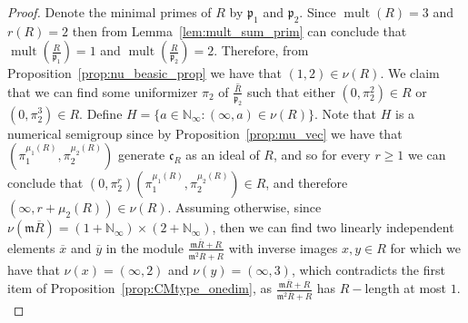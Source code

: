 \documentclass{article}
\DeclareMathOperator{\mult}{mult}
\numberwithin{theorem}{section}
\begin{document}
\begin{proof}
    Denote the minimal primes of $R$ by $\mathfrak{p}_1$ and $\mathfrak{p}_2$. Since $\mult(R)=3$ and $r(R)=2$ then from Lemma~\ref{lem:mult_sum_prim} can conclude that $\mult\left(\frac{R}{\mathfrak{p}_1}\right)=1$ and $\mult\left(\frac{R}{\mathfrak{p}_2}\right)=2$. Therefore, from Proposition~\ref{prop:nu_beasic_prop} we have that $(1,2) \in \nu(R)$.  We claim that we can find some uniformizer $\pi_2$ of $\overline{\frac{R}{\mathfrak{p}_2}}$ such that either $(0,\pi_2^2) \in R$ or $(0,\pi_2^3) \in R$. Define $H = \{a \in \mathbb{N}_\infty \colon (\infty, a) \in \nu(R)\}$. Note that $H$ is a numerical semigroup since by Proposition~\ref{prop:mu_vec} we have that $(\pi_1^{\mu_1(R)}, \pi_2^{\mu_2(R)})$ generate $\mathfrak{c}_R$ as an ideal of $R$, and so for every $r\geq 1$ we can conclude that $(0,\pi_2^r)(\pi_1^{\mu_1(R)}, \pi_2^{\mu_2(R)}) \in R$, and therefore $(\infty, r+\mu_2(R)) \in \nu(R)$. Assuming otherwise, since  $\nu(\mathfrak{m}\overline{R}) = (1 + \mathbb{N}_\infty) \times (2 + \mathbb{N}_\infty)$, then we can find two linearly independent elements $\overline{x}$ and $\overline{y}$ in the module $\frac{\mathfrak{m}\overline{R}+R}{\mathfrak{m}^2 \overline{R}+R}$ with inverse images $x,y \in R$ for which we have that $\nu(x) = (\infty, 2)$ and  $\nu(y) = (\infty, 3)$, which contradicts the first item of Proposition~\ref{prop:CMtype_onedim}, as $\frac{\mathfrak{m}\overline{R}+R}{\mathfrak{m}^2 \overline{R}+R}$ has $R-$length at most $1$. \\


\end{proof}
\end{document}
